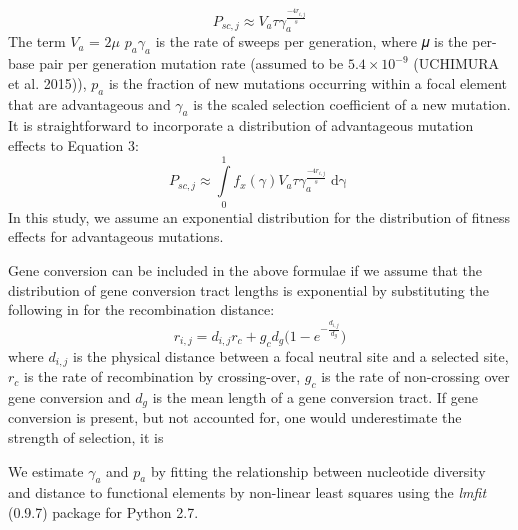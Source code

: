 \documentclass[11pt]{article}
\begin{document}
\begin{equation}
\label{jointApprox}
P_{sc,j} \approx V_a \tau\gamma_a^{\frac{-4r_{i,j}}{s}} 
\end{equation}
The term $V_{a}$ = $2\mu$ $p_{a}\gamma_{a}$ is the rate of sweeps per generation, where 𝜇 is the per-base pair per generation mutation rate (assumed to be $5.4 \times 10^{-9}$ (UCHIMURA et al. 2015)), $p_a$ is the fraction of new mutations occurring within a focal element that are advantageous and $\gamma_a$  is the scaled selection coefficient of a new mutation. It is straightforward to incorporate a distribution of advantageous mutation effects to Equation 3:
		\begin{equation}
P_{sc,j} \approx \int \limits_{0}^{1} f_x(\gamma)   V_a \tau\gamma_a^{\frac{-4r_{i,j}}{s}} \mathop{d\gamma}
\end{equation}	
In this study, we assume an exponential distribution for the distribution of fitness effects for advantageous mutations. 

	Gene conversion can be included in the above formulae if we assume that the distribution of gene conversion tract lengths is exponential  by substituting the following in for the recombination distance:
		\begin{equation}
		\label{geneConversion}
		r_{i,j} = d_{i,j} r_c + g_c d_g \Bigg( 1 - e ^{-\frac{d_{i,j}}{d_g}} \Bigg)
		\end{equation}
	where $d_{i,j}$ is the physical distance between a focal neutral site and a selected site, $r_c$ is the rate of recombination by crossing-over, $g_c$ is the rate of non-crossing over gene conversion and $d_g$ is the mean length of a gene conversion tract. If gene conversion is present, but not accounted for, one would underestimate the strength of selection, it is 
	
	We estimate $\gamma_a$ and $p_a$ by fitting the relationship between nucleotide diversity and distance to functional elements by non-linear least squares using the \emph{lmfit} (0.9.7) package for Python 2.7.
 
\end{document}
